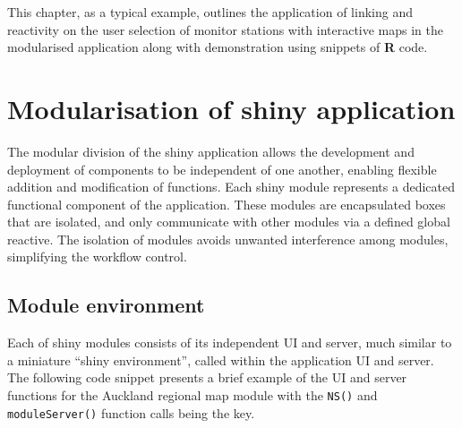 \documentclass{aucklandthesis}
\begin{document}
This chapter, as a typical example, outlines the application of linking and reactivity on the user selection of monitor stations with interactive maps in the modularised application along with demonstration using snippets of \textbf{R} code.

\hypertarget{modularisation-of-shiny-application}{%
\section{Modularisation of shiny application}\label{modularisation-of-shiny-application}}

The modular division of the shiny application allows the development and deployment of components to be independent of one another, enabling flexible addition and modification of functions. Each shiny module represents a dedicated functional component of the application. These modules are encapsulated boxes that are isolated, and only communicate with other modules via a defined global reactive. The isolation of modules avoids unwanted interference among modules, simplifying the workflow control.

\hypertarget{module-environment}{%
\subsection{Module environment}\label{module-environment}}

Each of shiny modules consists of its independent UI and server, much similar to a miniature ``shiny environment'', called within the application UI and server. The following code snippet presents a brief example of the UI and server functions for the Auckland regional map module with the \texttt{NS()} and \texttt{moduleServer()} function calls being the key.

\begin{Shaded}
\begin{Highlighting}[]
\StringTok{ }
\StringTok{ }
  \NormalTok{(}\NormalTok{(}\NormalTok{(}\NormalTok{), } \NormalTok{))}
\NormalTok{\}}

\StringTok{ }
\StringTok{ }
\NormalTok{    output[[}\NormalTok{]] <-}\StringTok{ }
\NormalTok{  \}}
\NormalTok{\}}
\end{Highlighting}
\end{Shaded}
\end{document}
